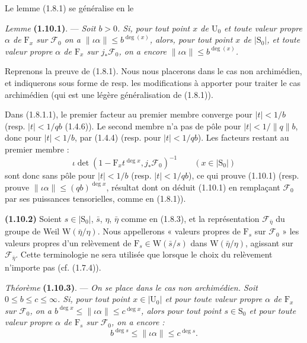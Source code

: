 \documentclass[11pt,leqno]{article}
\begin{document}
Le lemme (1.8.1) se généralise en le

\textit{Lemme} \textbf{(1.10.1)}. — \textit{Soit \(b>0\). Si, pour tout point \(x\) de \(\mathrm{U}_0\) et toute valeur propre \(\alpha\) de \(\mathrm{F}_x\) sur \(\mathscr{F}_0\) on a \(\lVert\iota\alpha\rVert\leq b^{\deg(x)}\), alors, pour tout point \(x\) de \(\lvert\mathrm{S}_0\rvert\), et toute valeur propre \(\alpha\) de \(\mathrm{F}_x\) sur \(j_*\mathscr{F}_0\), on a encore \(\lVert\iota\alpha\rVert\leq b^{\deg(x)}\).}

Reprenons la preuve de (1.8.1). Nous nous placerons dans le cas non archimédien, et indiquerons sous forme de resp. les modifications à apporter pour traiter le cas archimédien (qui est une légère généralisation de (1.8.1)).

Dans (1.8.1.1), le premier facteur au premier membre converge pour \(\lvert t\rvert<1/b\) (resp. \(\lvert t\rvert<1/qb\) (1.4.6)). Le second membre n’a pas de pôle pour \(\lvert t\rvert<1/\lVert q\rVert b\), donc pour \(\lvert t\rvert<1/b\), par (1.4.4) (resp. pour \(\lvert t\rvert<1/qb\)). Les facteurs restant au premier membre :
\[
\iota\det(1-\mathrm{F}_xt^{\deg x},j_*\mathscr{F}_0)^{-1}
\qquad (x\in\lvert\mathrm{S}_0\rvert)
\]
sont donc sans pôle pour \(\lvert t\rvert<1/b\) (resp. \(\lvert t\rvert<1/qb\)), ce qui prouve (1.10.1) (resp. prouve \(\lVert\iota\alpha\rVert\leq(qb)^{\deg x}\), résultat dont on déduit (1.10.1) en remplaçant \(\mathscr{F}_0\) par ses puissances tensorielles, comme en (1.8.1)).

\textbf{(1.10.2)} Soient \(s\in\lvert\mathrm{S}_0\rvert\), \(\bar{s}\), \(\eta\), \(\bar{\eta}\) comme en (1.8.3), et la représentation \(\mathscr{F}_{\bar{\eta}}\) du groupe de Weil \(\mathrm{W}(\bar{\eta}/\eta)\). Nous appellerons « valeurs propres de \(\mathrm{F}_s\) sur \(\mathscr{F}_0\) » les valeurs propres d’un relèvement de \(\mathrm{F}_s\in\mathrm{W}(\bar{s}/s)\) dans \(\mathrm{W}(\bar{\eta}/\eta)\), agissant sur \(\mathscr{F}_{\bar{\eta}}\). Cette terminologie ne sera utilisée que lorsque le choix du relèvement n’importe pas (cf. (1.7.4)).

\textit{Théorème} \textbf{(1.10.3)}. — \textit{On se place dans le cas non archimédien. Soit \(0\leq b\leq c\leq\infty\). Si, pour tout point \(x\in\lvert\mathrm{U}_0\rvert\) et pour toute valeur propre \(\alpha\) de \(\mathrm{F}_x\) sur \(\mathscr{F}_0\), on a \(b^{\deg x}\leq\lVert\iota\alpha\rVert\leq c^{\deg x}\), alors pour tout point \(s\in\mathrm{S}_0\) et pour toute valeur propre \(\alpha\) de \(\mathrm{F}_s\) sur \(\mathscr{F}_0\), on a encore :}
\[
b^{\deg s}\leq\lVert\iota\alpha\rVert\leq c^{\deg s}.
\]
\end{document}
